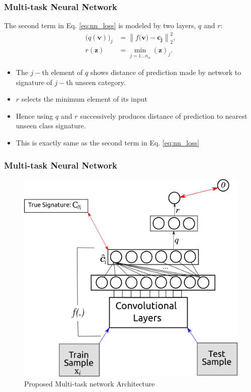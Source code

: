 \documentclass{beamer}
\newcommand{\normtwo}[1]{\left \lVert #1 \right \rVert_2^2}
\begin{document}
\begin{frame}\frametitle{Multi-task Neural Network}
The second term in Eq. \eqref{eq:nn_loss} is modeled by two layers, $q$ and $r$:
\begin{align}
\label{eq:min_layer}
\big(q(\mathbf{v})\big )_j &=  \normtwo{f(\mathbf{v) - c_j}}, \\
r(\mathbf{z}) &= \min_{j=1\ldots n_u} (\mathbf{z})_j.
\end{align}
\begin{itemize}
  \item The $j-$th element of $q$ shows distance of prediction made by network to signature of $j-$th unseen category.
  \item $r$ selects the minimum element of its input
  \item Hence using $q$ and $r$ successively produces distance of prediction to nearest unseen class signature.
  \item This is exactly same as the second term in Eq. \eqref{eq:nn_loss}
\end{itemize}
\end{frame}
\begin{frame}\frametitle{Multi-task Neural Network}
  \begin{figure}
  \includegraphics[scale=0.4]{net}
  \caption{Proposed Multi-task network Architecture}
  \end{figure}
\end{frame}
\end{document}
